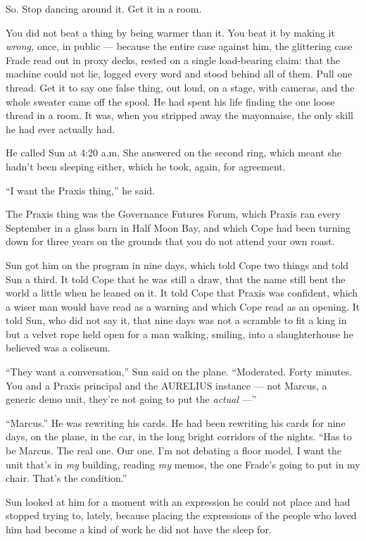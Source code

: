 \documentclass[11pt,openany]{book}
\newcommand{\scenebreak}{\par\vspace{0.5\baselineskip}\begin{center}\textasteriskcentered\quad\textasteriskcentered\quad\textasteriskcentered\end{center}\vspace{0.5\baselineskip}\par}
\begin{document}
So. Stop dancing around it. Get it in a room.

You did not beat a thing by being warmer than it. You beat it by making it \textit{wrong,} once, in public --- because the entire case against him, the glittering case Frade read out in proxy decks, rested on a single load-bearing claim: that the machine could not lie, logged every word and stood behind all of them. Pull one thread. Get it to say one false thing, out loud, on a stage, with cameras, and the whole sweater came off the spool. He had spent his life finding the one loose thread in a room. It was, when you stripped away the mayonnaise, the only skill he had ever actually had.

He called Sun at 4:20 a.m. She answered on the second ring, which meant she hadn't been sleeping either, which he took, again, for agreement.

``I want the Praxis thing,'' he said.


\scenebreak


The Praxis thing was the Governance Futures Forum, which Praxis ran every September in a glass barn in Half Moon Bay, and which Cope had been turning down for three years on the grounds that you do not attend your own roast.

Sun got him on the program in nine days, which told Cope two things and told Sun a third. It told Cope that he was still a draw, that the name still bent the world a little when he leaned on it. It told Cope that Praxis was confident, which a wiser man would have read as a warning and which Cope read as an opening. It told Sun, who did not say it, that nine days was not a scramble to fit a king in but a velvet rope held open for a man walking, smiling, into a slaughterhouse he believed was a coliseum.

``They want a conversation,'' Sun said on the plane. ``Moderated. Forty minutes. You and a Praxis principal and the AURELIUS instance --- not Marcus, a generic demo unit, they're not going to put the \textit{actual} ---''

``Marcus.'' He was rewriting his cards. He had been rewriting his cards for nine days, on the plane, in the car, in the long bright corridors of the nights. ``Has to be Marcus. The real one. Our one. I'm not debating a floor model. I want the unit that's in \textit{my} building, reading \textit{my} memos, the one Frade's going to put in my chair. That's the condition.''

Sun looked at him for a moment with an expression he could not place and had stopped trying to, lately, because placing the expressions of the people who loved him had become a kind of work he did not have the sleep for.
\end{document}
